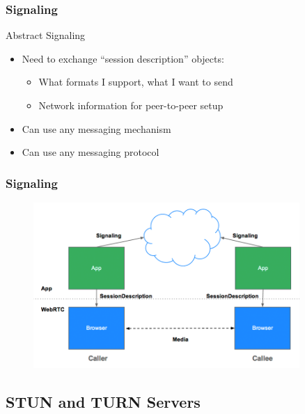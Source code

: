 \documentclass{beamer}
\begin{document}
\begin{frame}\frametitle{Signaling}
    
Abstract Signaling
\begin{itemize}
  \item Need to exchange ``session description'' objects:
  \begin{itemize}
    \item What formats I support, what I want to send
    \item Network information for peer-to-peer setup
  \end{itemize}
  \item Can use any messaging mechanism
  \item Can use any messaging protocol
\end{itemize}
\end{frame}


\begin{frame}[c]\frametitle{Signaling}

\begin{figure}
\centering
\includegraphics[width=0.9\textwidth]{images/jsep}
\end{figure}

\end{frame}

\subsection{STUN and TURN Servers}
\end{document}
